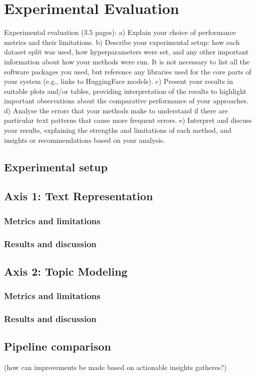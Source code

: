 \documentclass{article}
\begin{document}
\section{Experimental Evaluation}
Experimental evaluation (3.5 pages):
a) Explain your choice of performance metrics and their limitations.
b) Describe your experimental setup: how each dataset split was used, how hyperparameters
were set, and any other important information about how your methods were run. It is not
necessary to list all the software packages you used, but reference any libraries used for the
core parts of your system (e.g., links to HuggingFace models).
c) Present your results in suitable plots and/or tables, providing interpretation of the results to
highlight important observations about the comparative performance of your approaches.
d) Analyse the errors that your methods make to understand if there are particular text
patterns that cause more frequent errors.
e) Interpret and discuss your results, explaining the strengths and limitations of each method, and insights or recommendations based on your analysis.


\subsection{Experimental setup}
\subsection{Axis 1: Text Representation}
\subsubsection{Metrics and limitations}
\subsubsection{Results and discussion}


\subsection{Axis 2: Topic Modeling}
\subsubsection{Metrics and limitations}
\subsubsection{Results and discussion}
\subsection{Pipeline comparison}
(how can improvements be made based on actionable insights gatheres?)
\end{document}
